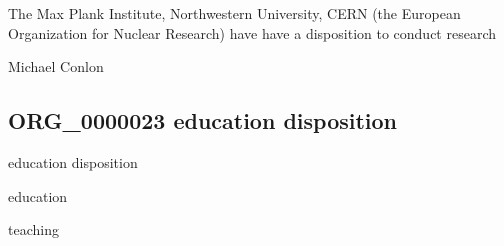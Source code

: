 \documentclass[letterpaper,10pt,english]{sphinxmanual}
\begin{document}
\begin{sphinxShadowBox}

\sphinxAtStartPar
The Max Plank Institute, Northwestern University, CERN (the European Organization for Nuclear Research) have have a disposition to conduct research
\end{sphinxShadowBox}

\begin{sphinxShadowBox}

\sphinxAtStartPar
{}
\end{sphinxShadowBox}

\begin{sphinxShadowBox}

\sphinxAtStartPar
Michael Conlon 
\end{sphinxShadowBox}
\begin{quote}

\ignorespaces \end{quote}


\subsection{ORG\_0000023 \sphinxhyphen{} education disposition}
\label{\detokenize{doc-ORG_0000023:org-0000023-education-disposition}}\label{\detokenize{doc-ORG_0000023:index-0}}\label{\detokenize{doc-ORG_0000023::doc}}
\begin{sphinxShadowBox}

\sphinxAtStartPar
education disposition
\end{sphinxShadowBox}

\begin{sphinxShadowBox}

\sphinxAtStartPar
education
\end{sphinxShadowBox}

\begin{sphinxShadowBox}

\sphinxAtStartPar
teaching
\end{sphinxShadowBox}
\end{document}

